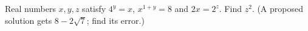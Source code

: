 Real numbers $x,y,z$ satisfy $4^y=x$, $x^{1+y}=8$ and $2x=2^z$. Find $z^2$. (A proposed solution gets $8-2\sqrt7$; find its error.)
